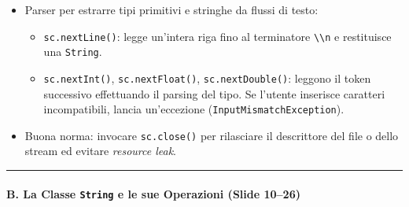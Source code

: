 \documentclass[11pt,a4paper]{article}
\newcommand{\passthrough}[1]{#1}
\providecommand{\tightlist}{\setlength{\itemsep}{0pt}\setlength{\parskip}{0pt}}
\begin{document}
\begin{itemize}
\begin{itemize}
    \begin{itemize}
    \tightlist
    \item
      Parser per estrarre tipi primitivi e stringhe da flussi di testo:

      \begin{itemize}
      \tightlist
      \item
        \passthrough{\lstinline!sc.nextLine()!}: legge un'intera riga
        fino al terminatore \passthrough{\lstinline!\\n!} e restituisce
        una \passthrough{\lstinline!String!}.
      \item
        \passthrough{\lstinline!sc.nextInt()!},
        \passthrough{\lstinline!sc.nextFloat()!},
        \passthrough{\lstinline!sc.nextDouble()!}: leggono il token
        successivo effettuando il parsing del tipo. Se l'utente
        inserisce caratteri incompatibili, lancia un'eccezione
        (\passthrough{\lstinline!InputMismatchException!}).
      \end{itemize}
    \item
      Buona norma: invocare \passthrough{\lstinline!sc.close()!} per
      rilasciare il descrittore del file o dello stream ed evitare
      \emph{resource leak}.
    \end{itemize}
  \end{itemize}
\end{itemize}

\begin{center}\rule{0.5\linewidth}{0.5pt}\end{center}

\paragraph{\texorpdfstring{B. La Classe \texttt{String} e le sue
Operazioni (Slide
10--26)}{B. La Classe String e le sue Operazioni (Slide 10--26)}}\label{b.-la-classe-string-e-le-sue-operazioni-slide-1026}
\end{document}
